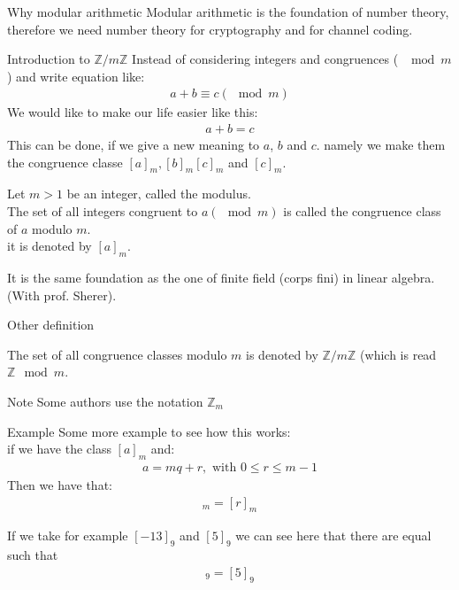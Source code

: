

\begin{parag}{Why modular arithmetic}
    Modular arithmetic is the foundation of number theory, therefore we need number theory for cryptography and for channel coding.

\end{parag}
\begin{parag}{Introduction to $ \mathbb{Z}/ m \mathbb{Z}$}
    Instead of considering integers and congruences ( $\mod m$) and write equation like:
    \begin{align*}
        a + b \equiv c ( \mod m)
    \end{align*}
    We would like to make our life easier like this:
    \begin{align*}
        a + b = c
    \end{align*}
    This can be done, if we give a new meaning to $a$, $b$ and $c$. namely we make them the congruence classe  $[a]_m, [b]_m [c]_m$ and $[c]_m$.
    \begin{definition}
        Let $m > 1$ be an integer, called the modulus.\\
        The set of all integers congruent to $a (\mod m)$ is called the congruence class of $ a$ modulo $m$.\\
        it is denoted by $[a]_m$.
    \end{definition}
    
    \begin{framedremark}
        It is the same foundation as the one of finite field (corps fini) in linear algebra. (With prof. Sherer).
    \end{framedremark}
\end{parag}

\begin{parag}{Other definition}
    \begin{definition}
        The set of all congruence classes modulo $m$ is denoted by $ \mathbb{Z}/ m \mathbb{Z}$ (which is read $ \mathbb{Z} \mod m$.
    \end{definition}
   \begin{subparag}{Note}
       Some authors use the notation $ \mathbb{Z}_m$
   \end{subparag} 
\end{parag}


\begin{parag}{Example}
    Some more example to see how this works:\\
    if we have the class $[a]_m$ and:
    \begin{align*}
        a = mq + r, \text{ with } 0 \leq r \leq m - 1
    \end{align*}
    Then we have that:
    \begin{align*}
        [a]_m = [r]_m
    \end{align*}
    
    If we take for example $[-13]_9$ and $[5]_9$ we can see here that there are equal such that
    \begin{align*}
        [-13]_9 = [5]_9
    \end{align*}

\end{parag}


